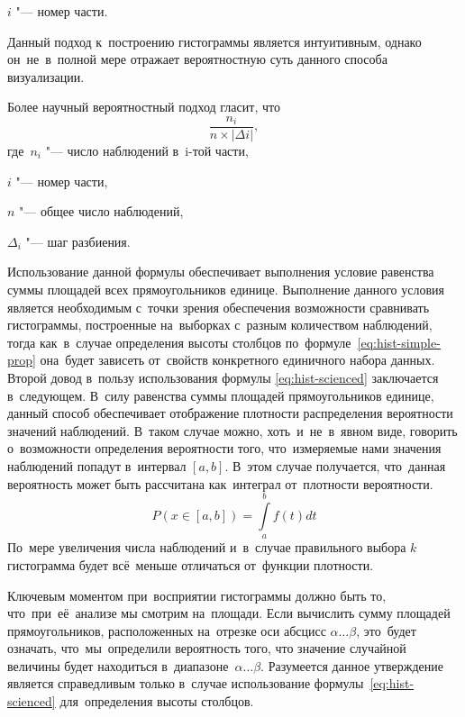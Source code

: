 \documentclass[]{scrartcl}
\begin{document}
$i$ "--- номер части. 

Данный подход к~построению гистограммы является интуитивным, однако он~не~в~полной мере отражает вероятностную суть данного способа визуализации.

Более научный вероятностный подход гласит, что
\begin{equation}\label{eq:hist-scienced}
\frac{n_{i}}{n \times |\Delta{i}|},
\end{equation}
где~$n_{i}$ "--- число наблюдений в~i-той части,

$i$ "--- номер части,

$n$ "--- общее число наблюдений,

$\Delta_{i}$ "--- шаг разбиения.

Использование данной формулы обеспечивает выполнения условие равенства суммы площадей всех
прямоугольников единице. Выполнение данного условия является необходимым с~точки зрения обеспечения возможности сравнивать гистограммы, построенные на~выборках с~разным количеством наблюдений, тогда как~в~случае определения высоты столбцов по~формуле~\ref{eq:hist-simple-prop} она~будет зависеть от~свойств конкретного единичного набора данных.
Второй довод в~пользу использования формулы \ref{eq:hist-scienced} заключается в~следующем. В~силу равенства суммы площадей прямоугольников единице, данный способ обеспечивает отображение плотности распределения вероятности значений наблюдений.
В~таком случае можно, хоть~и~не~в~явном виде, говорить о~возможности определения вероятности того, что~измеряемые нами значения наблюдений попадут в~интервал $[a, b]$. В~этом случае получается, что~данная вероятность может быть рассчитана как~интеграл от~плотности вероятности.
\begin{equation}\label{eq:prob-integral}
P(x \in [a, b]) = \int \limits_{a}^{b} f (t)dt
\end{equation}
По~мере увеличения числа наблюдений и~в~случае правильного выбора $k$ гистограмма будет всё~меньше отличаться от~функции плотности.

Ключевым моментом при~восприятии гистограммы должно быть то, что~при~её~анализе мы смотрим на~площади. Если вычислить сумму площадей прямоугольников, расположенных на~отрезке оси абсцисс $\alpha \ldots \beta$, это~будет означать, что~мы~определили вероятность того, что значение случайной величины будет находиться в~диапазоне~$\alpha \ldots \beta$. Разумеется данное утверждение является справедливым только в~случае использование формулы~\ref{eq:hist-scienced} для~определения высоты столбцов.
\end{document}
